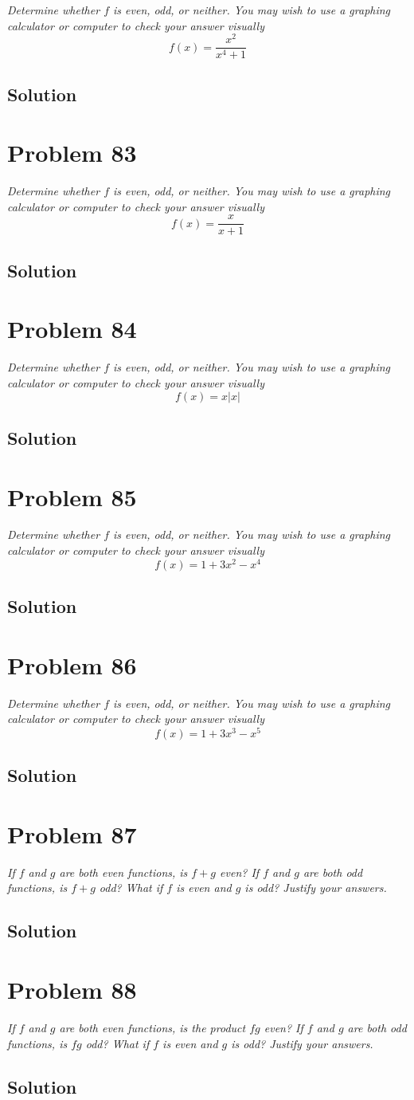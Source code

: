 \documentclass[11pt]{article}
\newcommand{\soln}{\subsection*}
\newcommand{\qn}{\textit}
\begin{document}
\qn{Determine whether $f$ is even, odd, or neither. You may wish to use a graphing calculator or computer to check your answer visually $$f(x)=\frac{x^2}{x^4+1}$$}

\soln{Solution}

\section*{Problem 83}

\qn{Determine whether $f$ is even, odd, or neither. You may wish to use a graphing calculator or computer to check your answer visually $$f(x)=\frac{x}{x+1}$$}

\soln{Solution}

\section*{Problem 84}

\qn{Determine whether $f$ is even, odd, or neither. You may wish to use a graphing calculator or computer to check your answer visually $$f(x)=x|x|$$}

\soln{Solution}

\section*{Problem 85}

\qn{Determine whether $f$ is even, odd, or neither. You may wish to use a graphing calculator or computer to check your answer visually $$f(x)=1+3x^2-x^4$$}

\soln{Solution}

\section*{Problem 86}

\qn{Determine whether $f$ is even, odd, or neither. You may wish to use a graphing calculator or computer to check your answer visually $$f(x)=1+3x^3-x^5$$}

\soln{Solution}

\section*{Problem 87}

\qn{If $f$ and $g$ are both even functions, is $f+g$ even? If $f$ and $g$ are both odd functions, is $f+g$ odd? What if $f$ is even and $g$ is odd? Justify your answers.}

\soln{Solution}

\section*{Problem 88}

\qn{If $f$ and $g$ are both even functions, is the product $fg$ even? If $f$ and $g$ are both odd functions, is $fg$ odd? What if $f$ is even and $g$ is odd? Justify your answers.}

\soln{Solution}
\end{document}

